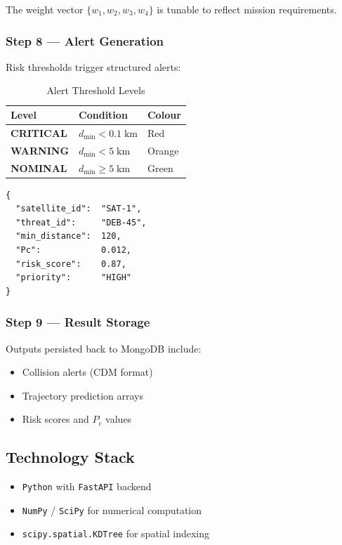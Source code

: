 \documentclass[11pt, a4paper]{article}
\newcommand{\tech}[1]{\texttt{\textcolor{headingblue}{#1}}}
\newcommand{\critical}[1]{\textcolor{alertred}{\textbf{#1}}}
\newcommand{\safe}[1]{\textcolor{safegreen}{\textbf{#1}}}
\begin{document}
The weight vector $\{w_1, w_2, w_3, w_4\}$ is tunable to reflect mission requirements.

\subsubsection{Step 8 --- Alert Generation}

Risk thresholds trigger structured alerts:

\begin{table}[H]
\centering
\begin{tabular}{lll}
\toprule
\textbf{Level} & \textbf{Condition} & \textbf{Colour} \\
\midrule
\critical{CRITICAL} & $d_{\min} < 0.1\;\text{km}$ & \cellcolor{red!20} Red \\
\textbf{WARNING} & $d_{\min} < 5\;\text{km}$ & \cellcolor{orange!25} Orange \\
\safe{NOMINAL} & $d_{\min} \geq 5\;\text{km}$ & \cellcolor{green!15} Green \\
\bottomrule
\end{tabular}
\caption{Alert Threshold Levels}
\end{table}

\begin{lstlisting}[style=jsonstyle, caption={Sample Alert / CDM Output}]
{
  "satellite_id":  "SAT-1",
  "threat_id":     "DEB-45",
  "min_distance":  120,
  "Pc":            0.012,
  "risk_score":    0.87,
  "priority":      "HIGH"
}
\end{lstlisting}

\subsubsection{Step 9 --- Result Storage}

Outputs persisted back to MongoDB include:
\begin{itemize}[leftmargin=1.5cm]
  \item Collision alerts (CDM format)
  \item Trajectory prediction arrays
  \item Risk scores and $P_c$ values
\end{itemize}

\subsection{Technology Stack}

\begin{itemize}[leftmargin=1.5cm]
  \item \tech{Python} with \tech{FastAPI} backend
  \item \tech{NumPy} / \tech{SciPy} for numerical computation
  \item \tech{scipy.spatial.KDTree} for spatial indexing
\end{itemize}
\end{document}
